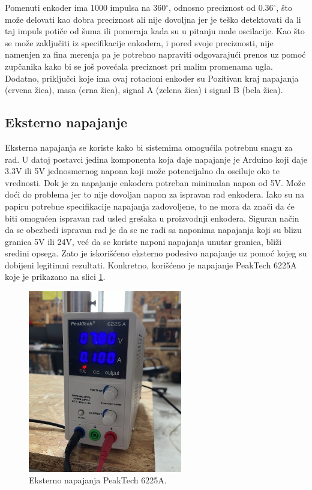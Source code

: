 \documentclass[a4paper, 12pt, diplomski]{etf}
\begin{document}
\noindent
Pomenuti enkoder ima 1000 impulsa na 360$^{\circ}$, odnosno preciznost od 0.36$^{\circ}$, što može delovati kao dobra preciznost ali nije dovoljna jer je teško detektovati da li taj impuls potiče od šuma ili pomeraja kada su u pitanju male oscilacije. Kao što se može zaključiti iz specifikacije enkodera, i pored svoje preciznosti, nije namenjen za fina merenja pa je potrebno napraviti odgovarajući prenos uz pomoć zupčanika kako bi se još povećala preciznost pri malim promenama ugla. Dodatno, priključci koje ima ovaj rotacioni enkoder su Pozitivan kraj napajanja (crvena žica), masa (crna žica), signal A (zelena žica) i signal B (bela žica).

\subsection{Eksterno napajanje}

Eksterna napajanja se koriste kako bi sistemima omogućila potrebnu snagu za rad. U datoj postavci jedina komponenta koja daje napajanje je Arduino koji daje 3.3V ili 5V jednosmernog napona koji može potencijalno da osciluje oko te vrednosti. Dok je za napajanje enkodera potreban minimalan napon od 5V. Može doći do problema jer to nije dovoljan napon za ispravan rad enkodera. Iako su na papiru potrebne specifikacije napajanja zadovoljene, to ne mora da znači da će biti omogućen ispravan rad usled grešaka u proizvodnji enkodera. Siguran način da se obezbedi ispravan rad je da se ne radi sa naponima napajanja koji su blizu granica 5V ili 24V, već da se koriste naponi napajanja unutar granica, bliži sredini opsega. Zato je iskorišćeno eksterno podesivo napajanje uz pomoć kojeg su dobijeni legitimni rezultati. Konkretno, korišćeno je napajanje PeakTech 6225A koje je prikazano na slici \ref{napajanje}.


\begin{figure}[h!]
    \centering
    \includegraphics[angle=0,width=0.6\textwidth]{real/peaktech2.jpeg}
    \caption{Eksterno napajanja PeakTech 6225A.}
    \label{napajanje}
\end{figure}
\end{document}
